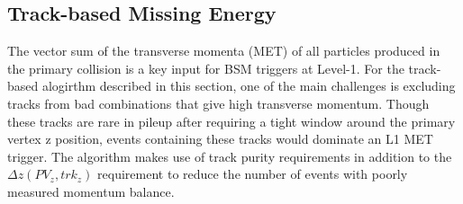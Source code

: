 \subsection{Track-based Missing Energy}
\label{sec:TkMET}

The vector sum of the transverse momenta (MET) of all particles produced in the primary collision is a key input for BSM triggers at Level-1. For the track-based alogirthm described in this section, one of the main challenges is excluding tracks from bad combinations that give high transverse momentum. Though these tracks are rare in pileup after requiring a tight window around the primary vertex z position, events containing these tracks would dominate an L1 MET trigger. The algorithm makes use of track purity requirements in addition to the $\Delta z\left(PV_{z}, trk_{z}\right)$ requirement to reduce the number of events with poorly measured momentum balance. 

